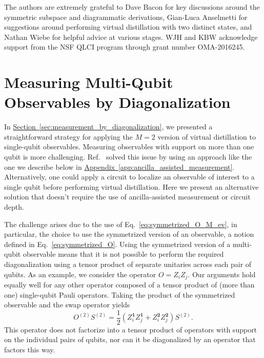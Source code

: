 \documentclass[
amsmath,
amssymb,
aps,
pra,
reprint,
twocolumn,
superscriptaddress,
longbibliography,
showkeys,
floatfix
]{revtex4-1}
\newcommand{\eq}[1]{Eq.~\hyperref[eq:#1]{\ref*{eq:#1}}}
\renewcommand{\sec}[1]{\hyperref[sec:#1]{Section~\ref*{sec:#1}}}
\newcommand{\app}[1]{\hyperref[app:#1]{Appendix~\ref*{app:#1}}}
\begin{document}
The authors are extremely grateful to Dave Bacon for key discussions around the
symmetric subspace and diagrammatic derivations, Gian-Luca Anselmetti for suggestions around performing virtual distillation with two distinct states, and Nathan Wiebe for helpful
advice at various stages. WJH and KBW acknowledge support from the NSF QLCI program through grant number OMA-2016245.



% 



\onecolumngrid
\appendix

\section{Measuring Multi-Qubit Observables by Diagonalization}
\label{app:diagonalize_multi_qubit}

In \sec{measurement_by_diagonalization}, we presented a straightforward
strategy for applying the \(M=2\) version of virtual distillation to
single-qubit observables.
Measuring observables with support on more than one qubit is more challenging.
Ref.~ solved this issue by using an approach like the one
we describe below in \app{ancilla_assisted_measurement}. Alternatively, one
could apply a circuit to localize an observable of interest to a single qubit
before performing virtual distillation.
Here we present an alternative solution that doesn't require the use of
ancilla-assisted measurement or circuit depth.


The challenge arises due to the use of \eq{symmetrized_O_M_ev}, in particular,
the choice to use the symmetrized version of an observable, a notion defined in
\eq{symmetrized_O}.
Using the symmetrized version of a multi-qubit observable means that it is not
possible to perform the required diagonalization using a tensor product of
separate unitaries across each pair of qubits.
As an example, we consider the operator \(O = Z_iZ_j\). 
Our arguments hold equally well for any other operator composed of a tensor
product of (more than one) single-qubit Pauli operators.
Taking the product of the symmetrized observable and the swap operator yields
\begin{equation}
  O^{(2)}S^{(2)} =
  \frac{1}{2}(Z_i^\textbf{1}Z_j^\textbf{1} + Z_i^\textbf{2}Z_j^\textbf{2})S^{(2)}.
  \label{eq:symmetrized_two_point_example}
\end{equation}
This operator does not factorize into a tensor product of operators with support
on the individual pairs of qubits, nor can it be diagonalized by an operator
that factors this way.
\end{document}
